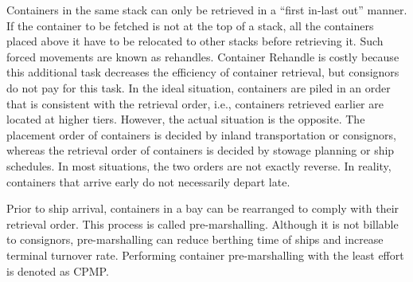 \documentclass[review,3p,times,authoryear,12pt]{elsarticle}
\begin{document}
Containers in the same stack can only be retrieved in a ``first in-last out'' manner. If the container to be fetched is not at the top of a stack, all the containers placed above it have to be relocated to other stacks before retrieving it. Such forced movements are known as rehandles. Container Rehandle is costly because this additional task decreases the efficiency of container retrieval, but consignors do not pay for this task. In the ideal situation, containers are piled in an order that is consistent with the retrieval order, i.e., containers retrieved earlier are located at higher tiers. However, the actual situation is the opposite. The placement order of containers is decided by inland transportation or consignors, whereas the retrieval order of containers is decided by stowage planning or ship schedules. In most situations, the two orders are not exactly reverse. In reality, containers that arrive early do not necessarily depart late.

Prior to ship arrival, containers in a bay can be rearranged to comply with their retrieval order. This process is called pre-marshalling. Although it is not billable to consignors, pre-marshalling can reduce berthing time of ships and increase terminal turnover rate. Performing container pre-marshalling with the least effort is denoted as CPMP.

\end{document}
